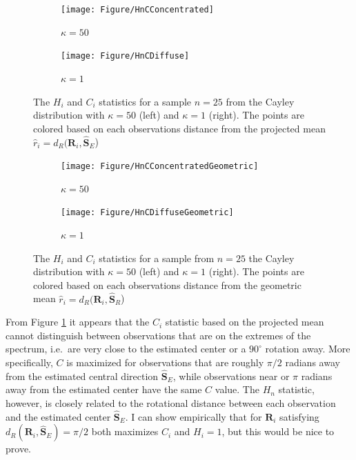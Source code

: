 \documentclass{article}\usepackage[]{graphicx}\usepackage[]{color}
\newcommand{\ProjMean}{{\widehat{\bm S}_{E}}}
\newcommand{\GeomMean}{{\widehat{\bm S}_{R}}}
\begin{document}
\begin{figure}
\centering
\begin{subfigure}[b]{0.45\textwidth}
        \texttt{[image: Figure/HnCConcentrated]}
        \caption{$\kappa=50$}
\end{subfigure}
\begin{subfigure}[b]{0.45\textwidth}
        \texttt{[image: Figure/HnCDiffuse]}
        \caption{$\kappa=1$}
        \label{fig:HnDiff}
\end{subfigure}
\caption{The $H_i$ and $C_i$ statistics for a sample $n=25$ from the Cayley distribution with $\kappa=50$ (left) and $\kappa=1$ (right).  The points are colored based on each observations distance from the projected mean $\hat r_i=d_R(\bm R_i,\ProjMean$)}
\label{fig:HnC}
\end{figure}

\begin{figure}
\centering
\begin{subfigure}[b]{0.45\textwidth}
        \texttt{[image: Figure/HnCConcentratedGeometric]}
        \caption{$\kappa=50$}
\end{subfigure}
\begin{subfigure}[b]{0.45\textwidth}
        \texttt{[image: Figure/HnCDiffuseGeometric]}
        \caption{$\kappa=1$}
        \label{fig:HnDiffGeom}
\end{subfigure}
\caption{The $H_i$ and $C_i$ statistics for a sample from $n=25$ the Cayley distribution with $\kappa=50$ (left) and $\kappa=1$ (right).  The points are colored based on each observations distance from the geometric mean $\hat r_i=d_R(\bm R_i,\GeomMean$)}
\label{fig:HnCGeom}
\end{figure}

From Figure \ref{fig:HnDiff} it appears that the $C_i$ statistic based on the projected mean cannot distinguish between observations that are on the extremes of the spectrum, i.e.~are very close to the estimated center or a $90^\circ$ rotation away.  More specifically, $C$ is maximized for observations that are roughly $\pi/2$ radians away from the estimated central direction $\ProjMean$, while observations near or $\pi$ radians away from the estimated center have the same $C$ value.  %
The $H_n$ statistic, however, is closely related to the rotational distance between each observation and the estimated center $\ProjMean$.  I can show empirically that for $\bm R_i$ satisfying $d_R(\bm R_i,\ProjMean)=\pi/2$ both maximizes $C_i$ and $H_i=1$, but this would be nice to prove. 
\end{document}
